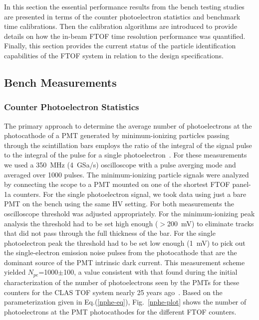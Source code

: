 \documentclass[final,3p,twocolumn]{elsarticle}
\begin{document}
In this section the essential performance results from the bench testing studies are presented in terms
of the counter photoelectron statistics and benchmark time calibrations. Then the calibration algorithms
are introduced to provide details on how the in-beam FTOF time resolution performance was quantified.
Finally, this section provides the current status of the particle identification capabilities of the FTOF
system in relation to the design specifications.

\subsection{Bench Measurements}

\subsubsection{Counter Photoelectron Statistics}
\label{sec:npe}

The primary approach to determine the average number of photoelectrons at the photocathode of a PMT
generated by minimum-ionizing particles passing through the scintillation bars employs the ratio of the
integral of the signal pulse to the integral of the pulse for a single photoelectron~\cite{Gi86}. For these
measurements we used a 350~MHz (4~GSa/s) oscilloscope with a pulse averging mode and averaged over
1000 pulses. The minimum-ionizing particle signals were analyzed by connecting the scope to a PMT mounted
on one of the shortest FTOF panel-1a counters. For the single photoelectron signal, we took data using just a
bare PMT on the bench using the same HV setting. For both measurements the oscilloscope threshold was
adjusted appropriately. For the minimum-ionizing peak analysis the threshold had to be set high enough
($>$200~mV) to eliminate tracks that did not pass through the full thickness of the bar. For the single
photoelectron peak the threshold had to be set low enough (1~mV) to pick out the single-electron emission
noise pulses from the photocathode that are the dominant source of the PMT intrinsic dark current. This
measurement scheme yielded $N_{pe}$=1000$\pm$100, a value consistent with that found during the initial
characterization of the number of photoelectrons seen by the PMTs for these counters for the CLAS TOF
system nearly 25 years ago~\cite{tof-nim}. Based on the parameterization given in Eq.(\ref{nphe-eq}),
Fig.~\ref{nphe-plot} shows the number of photoelectrons at the PMT photocathodes for the different FTOF
counters.
\end{document}
